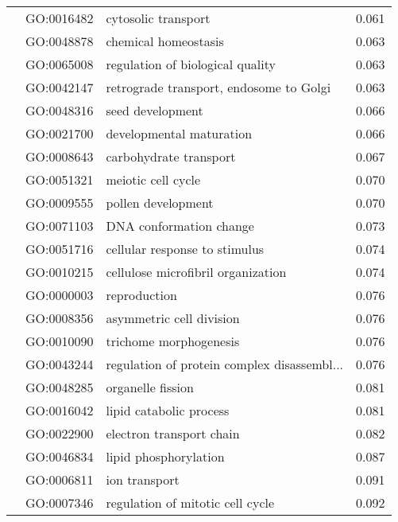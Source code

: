 \begin{longtable}{lllr}
   & GO:0016482 &                          cytosolic transport &         0.061 \\
   & GO:0048878 &                         chemical homeostasis &         0.063 \\
   & GO:0065008 &             regulation of biological quality &         0.063 \\
   & GO:0042147 &      retrograde transport, endosome to Golgi &         0.063 \\
   & GO:0048316 &                             seed development &         0.066 \\
   & GO:0021700 &                     developmental maturation &         0.066 \\
   & GO:0008643 &                       carbohydrate transport &         0.067 \\
   & GO:0051321 &                           meiotic cell cycle &         0.070 \\
   & GO:0009555 &                           pollen development &         0.070 \\
   & GO:0071103 &                      DNA conformation change &         0.073 \\
   & GO:0051716 &                cellular response to stimulus &         0.074 \\
   & GO:0010215 &           cellulose microfibril organization &         0.074 \\
   & GO:0000003 &                                 reproduction &         0.076 \\
   & GO:0008356 &                     asymmetric cell division &         0.076 \\
   & GO:0010090 &                       trichome morphogenesis &         0.076 \\
   & GO:0043244 &  regulation of protein complex disassembl... &         0.076 \\
   & GO:0048285 &                            organelle fission &         0.081 \\
   & GO:0016042 &                      lipid catabolic process &         0.081 \\
   & GO:0022900 &                     electron transport chain &         0.082 \\
   & GO:0046834 &                        lipid phosphorylation &         0.087 \\
   & GO:0006811 &                                ion transport &         0.091 \\
   & GO:0007346 &             regulation of mitotic cell cycle &         0.092 \\

\end{longtable}
